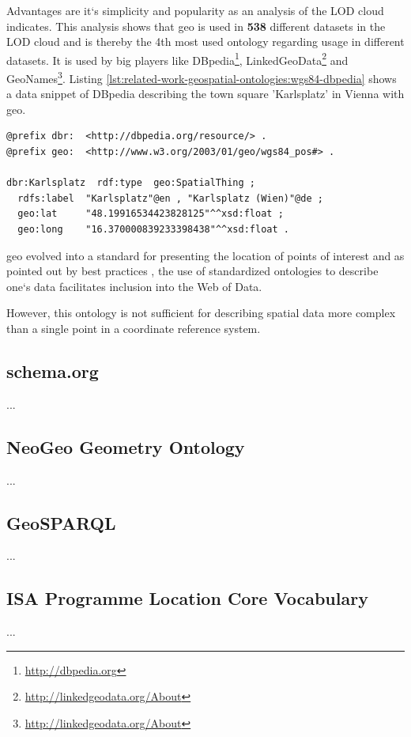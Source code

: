 \documentclass[draft,final]{vutinfth} %
\begin{document}
Advantages are it`s simplicity and popularity as an analysis of the LOD cloud\cite{research_group:_akws_lodstats_????} indicates. This analysis shows that \gls{geo} is used in \textbf{538} different datasets in the LOD cloud and is thereby the 4th most used ontology regarding usage in different datasets. It is used by big players like DBpedia\footnote{\url{http://dbpedia.org}}, LinkedGeoData\footnote{\url{http://linkedgeodata.org/About}} and GeoNames\footnote{\url{http://linkedgeodata.org/About}}. 
Listing \ref{lst:related-work-geospatial-ontologies:wgs84-dbpedia} shows a data snippet of DBpedia describing the town square 'Karlsplatz' in Vienna with \gls{geo}.

\begin{lstlisting}[frame=single, caption=Snippet of DBpedia, label={lst:related-work-geospatial-ontologies:wgs84-dbpedia}]
@prefix dbr:  <http://dbpedia.org/resource/> .
@prefix geo:  <http://www.w3.org/2003/01/geo/wgs84_pos#> .

dbr:Karlsplatz  rdf:type  geo:SpatialThing ;
  rdfs:label  "Karlsplatz"@en , "Karlsplatz (Wien)"@de ;
  geo:lat     "48.19916534423828125"^^xsd:float ;
  geo:long    "16.370000839233398438"^^xsd:float .
\end{lstlisting}

\gls{geo} evolved into a standard for presenting the location of points of interest and  as pointed out by best practices \cite{hyland_best_2014}, the use of standardized ontologies to describe one`s data facilitates inclusion into the Web of Data. 

However, this ontology is not sufficient for describing spatial data more complex than a single point in a coordinate reference system.


\subsection{schema.org}
...

\subsection{NeoGeo Geometry Ontology}
...

\subsection{GeoSPARQL}
...

\subsection{ISA Programme Location Core Vocabulary}
...
\end{document}
